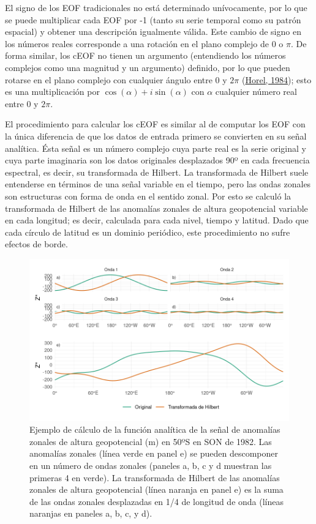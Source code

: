 \documentclass[12pt,oneside,a4paper]{reedthesis}
\begin{document}
El signo de los EOF tradicionales no está determinado unívocamente, por lo que se puede multiplicar cada EOF por -1 (tanto su serie temporal como su patrón espacial) y obtener una descripción igualmente válida.
Este cambio de signo en los números reales corresponde a una rotación en el plano complejo de 0 o \(\pi\).
De forma similar, los cEOF no tienen un argumento (entendiendo los números complejos como una magnitud y un argumento) definido, por lo que pueden rotarse en el plano complejo con cualquier ángulo entre 0 y \(2\pi\) (\protect\hyperlink{ref-horel1984}{Horel, 1984}); esto es una multiplicación por \(\cos(\alpha) + i\sin(\alpha)\) con \(\alpha\) cualquier número real entre 0 y \(2\pi\).

El procedimiento para calcular los cEOF es similar al de computar los EOF con la única diferencia de que los datos de entrada primero se convierten en su señal analítica.
Ésta señal es un número complejo cuya parte real es la serie original y cuya parte imaginaria son los datos originales desplazados 90º en cada frecuencia espectral, es decir, su transformada de Hilbert.
La transformada de Hilbert suele entenderse en términos de una señal variable en el tiempo, pero las ondas zonales son estructuras con forma de onda en el sentido zonal.
Por esto se calculó la transformada de Hilbert de las anomalías zonales de altura geopotencial variable en cada longitud; es decir, calculada para cada nivel, tiempo y latitud.
Dado que cada círculo de latitud es un dominio periódico, este procedimiento no sufre efectos de borde.



\begin{figure}

{\centering \includegraphics{figures/20-ceofs/hilbert-ejemplo-1} 

}

\caption{Ejemplo de cálculo de la función analítica de la señal de anomalías zonales de altura geopotencial (m) en 50ºS en SON de 1982. Las anomalías zonales (línea verde en panel e) se pueden descomponer en un número de ondas zonales (paneles a, b, c y d muestran las primeras 4 en verde). La transformada de Hilbert de las anomalías zonales de altura geopotencial (línea naranja en panel e) es la suma de las ondas zonales desplazadas en 1/4 de longitud de onda (líneas naranjas en paneles a, b, c, y d).}\label{fig:hilbert-ejemplo}
\end{figure}
\end{document}
